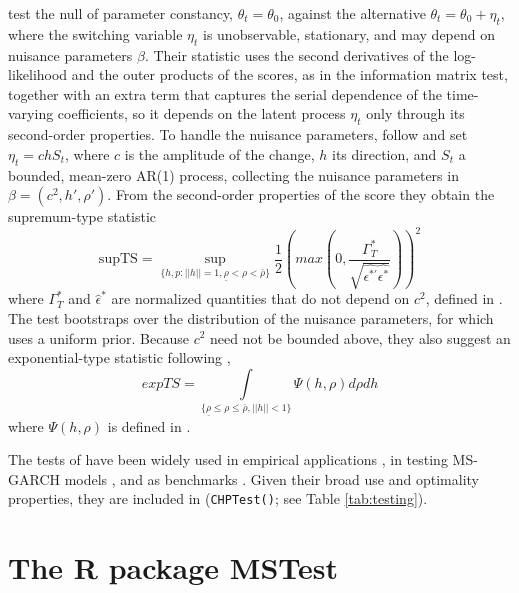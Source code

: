 \citet{chp14} test the null of parameter constancy, \(\theta_t = \theta_0\), against the alternative \(\theta_t = \theta_0 + \eta_t\), where the switching variable \(\eta_t\) is unobservable, stationary, and may depend on nuisance parameters \(\beta\). Their statistic uses the second derivatives of the log-likelihood and the outer products of the scores, as in the information matrix test, together with an extra term that captures the serial dependence of the time-varying coefficients, so it depends on the latent process \(\eta_t\) only through its second-order properties. To handle the nuisance parameters, \citet{chp14} follow \citet{davies87} and set \(\eta_t = chS_t\), where \(c\) is the amplitude of the change, \(h\) its direction, and \(S_t\) a bounded, mean-zero AR(1) process, collecting the nuisance parameters in \(\beta = (c^2, h', \rho')\). From the second-order properties of the score they obtain the supremum-type statistic
\begin{equation*}
    \text{supTS} = \sup_{\{h, p:||h||=1, \underline{\rho} < \rho < \bar{\rho}\}} \frac{1}{2} (max(0, \frac{\Gamma^*_T}{\sqrt{\hat{\epsilon^{*'}}\hat{\epsilon^*}}}))^2
\end{equation*}
where \(\Gamma^*_T\) and \(\hat{\epsilon}^*\) are normalized quantities that do not depend on \(c^2\), defined in \citet{chp14}. The test bootstraps over the distribution of the nuisance parameters, for which  uses a uniform prior. Because \(c^2\) need not be bounded above, they also suggest an exponential-type statistic following \citet{andrewsploberger94},
\begin{equation*}
    expTS = \int\limits_{\{\underline{\rho} \leq \rho \leq \bar\rho, ||h||<1 \}} \Psi(h,\rho) d\rho dh
\end{equation*}
where \(\Psi(h,\rho)\) is defined in \citet{chp14}.

The tests of \citet{chp14} have been widely used in empirical applications \citep{hamilton05, warnevredin06, kahnrich07, morleypiger12, DMPF11}, in testing MS-GARCH models \citep{hushin08}, and as benchmarks \citep{dufourluger17, quzhuo2021likelihood, rodrondufour_mcmstest}. Given their broad use and optimality properties, they are included in  (\texttt{CHPTest()}; see Table \ref{tab:testing}).

\section{The R package MSTest}\label{software}

